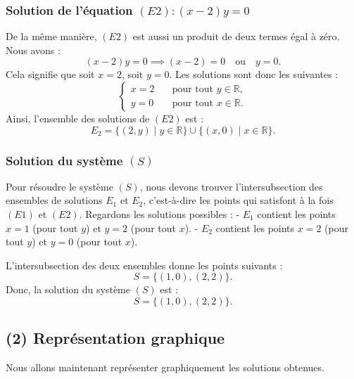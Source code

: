 \documentclass[a4paper,oneside,12pt]{amsbook}
\theoremstyle{definition}
\theoremstyle{remark}
\begin{document}
\subsubsection*{Solution de l'équation \((E2) : (x - 2)y = 0\)}

De la même manière, \((E2)\) est aussi un produit de deux termes égal à zéro. Nous avons :
\[
(x - 2)y = 0 \implies (x - 2) = 0 \quad \text{ou} \quad y = 0.
\]
Cela signifie que soit \(x = 2\), soit \(y = 0\). Les solutions sont donc les suivantes :
\[
\begin{cases}
    x = 2 \quad &\text{pour tout } y \in \mathbb{R}, \\
    y = 0 \quad &\text{pour tout } x \in \mathbb{R}.
\end{cases}
\]
Ainsi, l'ensemble des solutions de \((E2)\) est :
\[
E_2 = \{ (2, y) \mid y \in \mathbb{R} \} \cup \{ (x, 0) \mid x \in \mathbb{R} \}.
\]

\subsubsection*{Solution du système \((S)\)}

Pour résoudre le système \((S)\), nous devons trouver l'intersubsection des ensembles de solutions \(E_1\) et \(E_2\), c'est-à-dire les points qui satisfont à la fois \((E1)\) et \((E2)\). Regardons les solutions possibles :
- \(E_1\) contient les points \(x = 1\) (pour tout \(y\)) et \(y = 2\) (pour tout \(x\)).
- \(E_2\) contient les points \(x = 2\) (pour tout \(y\)) et \(y = 0\) (pour tout \(x\)).

L'intersubsection des deux ensembles donne les points suivants :
\[
S = \{ (1, 0), (2, 2) \}.
\]
Donc, la solution du système \((S)\) est :
\[
S = \{ (1, 0), (2, 2) \}.
\]

\subsection*{(2) Représentation graphique}
Nous allons maintenant représenter graphiquement les solutions obtenues.
\begin{center}
\end{center}
\end{document}
